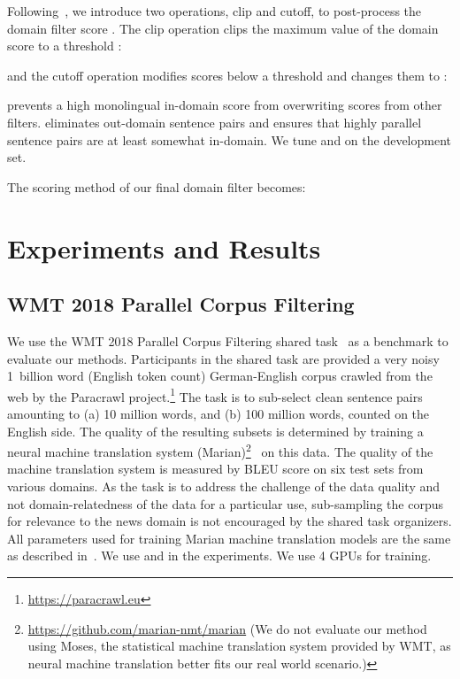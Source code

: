 \documentclass[11pt,a4paper]{article}
\begin{document}
Following~\citet{junczys2018dual}, we introduce two operations, clip and cutoff, to post-process the domain filter score . The clip operation clips the maximum value of the domain score to a threshold :


and the cutoff operation modifies scores below a threshold  and changes them to :


 prevents a high monolingual in-domain score from overwriting scores from other filters.  eliminates out-domain sentence pairs and ensures that highly parallel sentence pairs are at least somewhat in-domain. We tune  and  on the development set.

The scoring method of our final domain filter becomes:






%
 


\section{Experiments and Results}


\subsection{WMT 2018 Parallel Corpus Filtering}

We use the WMT 2018 Parallel Corpus Filtering shared task~\cite{koehn2018findings} as a benchmark to evaluate our methods. Participants in the shared task are provided a very noisy 1~billion word (English token count) German-English corpus crawled from the web by the Paracrawl project.\footnote{\url{https://paracrawl.eu}} The task is to sub-select clean sentence pairs amounting to (a) 10 million words, and (b) 100 million words, counted on the English side. The quality of the resulting subsets is determined by training a neural machine translation system (Marian)\footnote{\url{https://github.com/marian-nmt/marian} (We do not evaluate our method using Moses, the statistical machine translation system provided by WMT, as neural machine translation better fits our real world scenario.)}~\cite{mariannmt} on this data. The quality of the machine translation system is measured by BLEU score on six test sets from various domains. As the task is to address the challenge of the data quality and not domain-relatedness of the data for a particular use, sub-sampling the corpus for relevance to the news domain is not encouraged by the shared task organizers.
All parameters used for training Marian machine translation models are the same as described in~\citet{koehn2018findings}.
We use  and  in the experiments. We use 4 GPUs for training.
\end{document}
